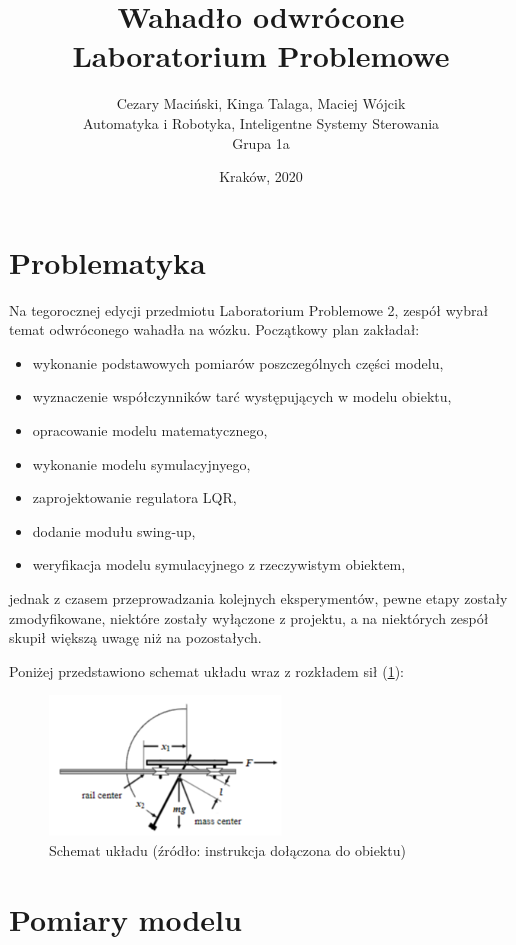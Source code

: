 \documentclass[12pt]{article}
\title{Wahadło odwrócone \vspace{2px}\\\small{Laboratorium Problemowe}}
\author{Cezary Maciński, Kinga Talaga, Maciej Wójcik\\Automatyka i Robotyka, Inteligentne Systemy Sterowania\\Grupa 1a}
\date{Kraków, 2020}
\numberwithin{equation}{section}
\begin{document}
\maketitle
\newpage
\tableofcontents
\newpage

\section{Problematyka}

Na tegorocznej edycji przedmiotu Laboratorium Problemowe 2, zespół wybrał temat odwróconego wahadła na wózku. Początkowy plan zakładał: 
\begin{itemize}
    \item wykonanie podstawowych pomiarów poszczególnych części modelu,
    \item wyznaczenie współczynników tarć występujących w modelu obiektu,
    \item opracowanie modelu matematycznego,
    \item wykonanie modelu symulacyjnyego,
    \item zaprojektowanie regulatora LQR,
    \item dodanie modułu swing-up,
    \item weryfikacja modelu symulacyjnego z rzeczywistym obiektem,
\end{itemize} 
jednak z czasem przeprowadzania kolejnych eksperymentów, pewne etapy zostały zmodyfikowane, niektóre zostały wyłączone z projektu, a na niektórych zespół skupił większą uwagę niż na pozostałych.

Poniżej przedstawiono schemat układu wraz z rozkładem sił (\ref{fig:schemat}):

\begin{figure}[H]
    \centering
    \includegraphics[width=0.55\textwidth]{schemat.png}
    \caption{Schemat układu (źródło: instrukcja dołączona do obiektu)}
    \label{fig:schemat}
\end{figure}

\newpage

\section{Pomiary modelu}
\end{document}
